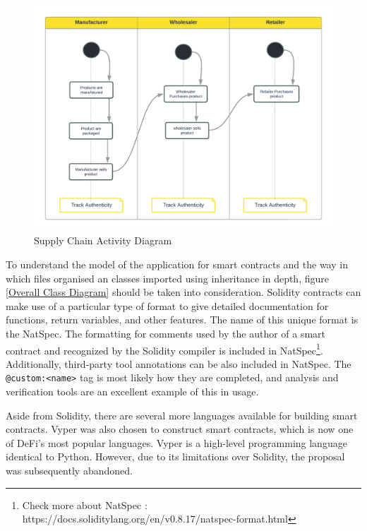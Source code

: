 \begin{figure}[h]
\centering
  \includegraphics[width=12cm]{includes/figures/Activity Diagram.png} 
  \caption{Supply Chain Activity Diagram}
  \label{Activity Diagram}
\end{figure}

\vspace{.5cm}

To understand the model of the application for smart contracts and the way in which files organised an classes imported using inheritance in depth, figure \ref{Overall Class Diagram} should be taken into consideration. Solidity contracts can make use of a particular type of format to give detailed documentation for functions, return variables, and other features. The name of this unique format is the \ac{NatSpec}. The formatting for comments used by the author of a smart contract and recognized by the Solidity compiler is included in \ac{NatSpec}\footnote{Check more about NatSpec : https://docs.soliditylang.org/en/v0.8.17/natspec-format.html}. Additionally, third-party tool annotations can be also included in \ac{NatSpec}. The \texttt{@custom:<name>} tag is most likely how they are completed, and analysis and verification tools are an excellent example of this in usage.

\vspace{.5cm}

Aside from Solidity, there are several more languages available for building smart contracts. Vyper was also chosen to construct smart contracts, which is now one of \ac{DeFi}'s most popular languages. Vyper is a high-level programming language identical to Python. However, due to its limitations over Solidity, the proposal was subsequently abandoned.

